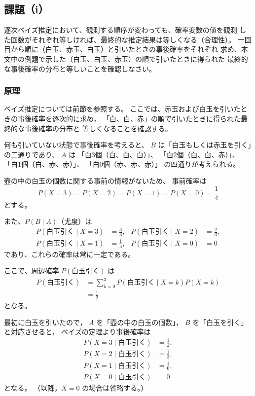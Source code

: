 \documentclass[10pt,a4paper,titlepage]{jreport} %
\begin{document}
\subsection{課題（i）}

逐次ベイズ推定において、観測する順序が変わっても、確率変数の値を観測
した回数がそれぞれ等しければ、最終的な推定結果は等しくなる（合理性）。
一回目から順に（白玉、赤玉、白玉）と引いたときの事後確率をそれぞれ
求め、本文中の例題で示した（白玉、白玉、赤玉）の順で引いたときに得られた
最終的な事後確率の分布と等しいことを確認しなさい。

\subsubsection{原理}

ベイズ推定については前節を参照する。
ここでは、赤玉および白玉を引いたときの事後確率を逐次的に求め，
「白、白、赤」の順で引いたときに得られた最終的な事後確率の分布と
等しくなることを確認する。

何も引いていない状態で事後確率を考えると、
$B$ は「白玉もしくは赤玉を引く」の二通りであり、
$A$ は
「白3個（白、白、白）」、
「白2個（白、白、赤）」、
「白1個（白、赤、赤）」、
「白0個（赤、赤、赤）」
の四通りが考えられる。

壺の中の白玉の個数に関する事前の情報がないため、
事前確率は
\begin{equation}
P(X=3)=P(X=2)=P(X=1)=P(X=0)=\frac{1}{4}
\end{equation}
とする。

また、$P(B\mid A)$（尤度）は
\begin{align}
P(\text{白玉引く}\mid X=3) &= \frac{3}{3}, &
P(\text{白玉引く}\mid X=2) &= \frac{2}{3}, \\
P(\text{白玉引く}\mid X=1) &= \frac{1}{3}, &
P(\text{白玉引く}\mid X=0) &= 0
\end{align}
であり、これらの確率は常に一定である。

ここで、周辺確率 $P(\text{白玉引く})$ は
\begin{align}
P(\text{白玉引く})
&= \sum_{k=0}^{3} P(\text{白玉引く}\mid X=k)P(X=k) \\
&= \frac{1}{2}
\end{align}
となる。

最初に白玉を引いたので，
$A$ を「壺の中の白玉の個数」，
$B$ を「白玉を引く」と対応させると，
ベイズの定理より事後確率は
\begin{align}
P(X=3\mid \text{白玉引く}) &= \frac{1}{2}, \\
P(X=2\mid \text{白玉引く}) &= \frac{1}{3}, \\
P(X=1\mid \text{白玉引く}) &= \frac{1}{6}, \\
P(X=0\mid \text{白玉引く}) &= 0
\end{align}
となる。
（以降，$X=0$ の場合は省略する。）
\end{document}
